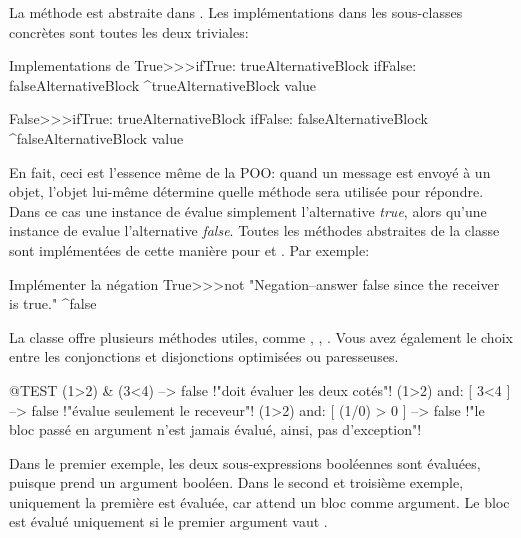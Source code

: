\documentclass[a4paper,10pt,twoside]{book}
\begin{document}
La m\'ethode est abstraite dans .
Les impl\'ementations dans les sous-classes concr\`etes sont toutes les deux triviales:

\begin{method}{Implementations de }
True>>>ifTrue: trueAlternativeBlock ifFalse: falseAlternativeBlock 
    ^trueAlternativeBlock value

False>>>ifTrue: trueAlternativeBlock ifFalse: falseAlternativeBlock 
    ^falseAlternativeBlock value
\end{method}

En fait, ceci est l'essence m\^eme de la POO: quand un message est envoy\'e \`a un objet, l'objet lui-m\^eme d\'etermine quelle m\'ethode sera utilis\'ee pour r\'epondre. Dans ce cas une instance de   \'evalue simplement l'alternative \emph{true}, alors qu'une instance de  evalue l'alternative \emph{false}.  Toutes les m\'ethodes abstraites de la classe  sont impl\'ement\'ees de cette mani\`ere pour  et . Par exemple:

\begin{method}{Impl\'ementer la n\'egation}
True>>>not
    "Negation--answer false since the receiver is true."
    ^false
\end{method}

La classe  offre plusieurs m\'ethodes utiles, comme , , . Vous avez \'egalement le choix entre les conjonctions et disjonctions optimis\'ees ou paresseuses.

\begin{code}{@TEST}
(1>2) & (3<4)              --> false    !"doit \'evaluer les deux cot\'es"!
(1>2) and: [ 3<4 ]        --> false    !"\'evalue seulement le receveur"!
(1>2) and: [ (1/0) > 0 ] --> false    !"le bloc pass\'e en argument n'est jamais \'evalu\'e, ainsi, pas d'exception"!
\end{code}

Dans le premier exemple, les deux sous-expressions bool\'eennes sont \'evalu\'ees, puisque  prend un argument bool\'een.
Dans le second et troisi\`eme exemple, uniquement la premi\`ere est \'evalu\'ee, car  attend un  bloc comme argument. Le  bloc est \'evalu\'e uniquement si le premier argument vaut .

\end{document}
